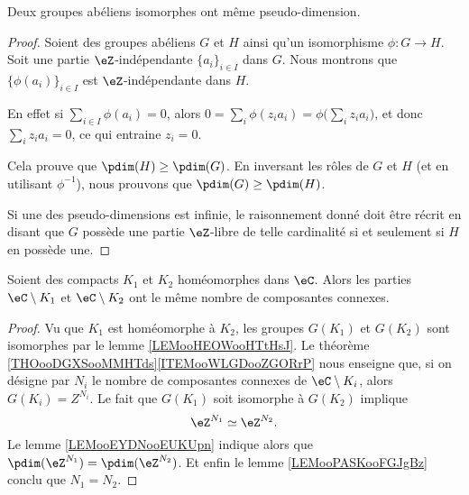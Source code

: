 \begin{lemma}		\label{LEMooEYDNooEUKUpn}
	Deux groupes abéliens isomorphes ont même pseudo-dimension.
\end{lemma}

\begin{proof}
	Soient des groupes abéliens \( G\) et \( H\) ainsi qu'un isomorphisme \(\phi \colon G\to H  \). Soit une partie \( \eZ\)-indépendante \( \{ a_i \}_{i\in I}\) dans \( G\). Nous montrons que \( \{ \phi(a_i) \}_{i\in I}\) est \( \eZ\)-indépendante dans \( H\).

	En effet si \( \sum_{i\in I}\phi(a_i)=0\), alors \( 0=\sum_i\phi(z_ia_i)=\phi\big( \sum_iz_ia_i \big)\), et donc \( \sum_iz_ia_i=0\), ce qui entraine \( z_i=0\).

	Cela prouve que \( \pdim(H)\geq\pdim(G)\). En inversant les rôles de \( G\) et \( H\) (et en utilisant \( \phi^{-1}\)), nous prouvons que \( \pdim(G)\geq \pdim(H)\).

	Si une des pseudo-dimensions est infinie, le raisonnement donné doit être récrit en disant que \( G\) possède une partie \( \eZ\)-libre de telle cardinalité si et seulement si \( H\) en possède une.
\end{proof}

\begin{corollary}		\label{CORooQNUIooKLtWVD}
	Soient des compacts \( K_1\) et \( K_2\) homéomorphes dans \( \eC\). Alors les parties \( \eC\setminus K_1\) et \( \eC\setminus K_2\) ont le même nombre de composantes connexes.
\end{corollary}

\begin{proof}
	Vu que \( K_1\) est homéomorphe à \( K_2\), les groupes \( G(K_1)\) et \( G(K_2)\) sont isomorphes par le lemme \ref{LEMooHEOWooHTtHsJ}. Le théorème \ref{THOooDGXSooMMHTds}\ref{ITEMooWLGDooZGORrP} nous enseigne que, si on désigne par \( N_i\) le nombre de composantes connexes de \( \eC\setminus K_i\), alors \( G(K_i)=Z^{N_i}\). Le fait que \( G(K_1)\) soit isomorphe à \( G(K_2)\) implique
	\begin{equation}
		\eZ^{N_1}\simeq \eZ^{N_2}.
	\end{equation}
	Le lemme \ref{LEMooEYDNooEUKUpn} indique alors que \( \pdim(\eZ^{N_1})=\pdim(\eZ^{N_2})\). Et enfin le lemme \ref{LEMooPASKooFGJgBz} conclu que \( N_1=N_2\).
\end{proof}

